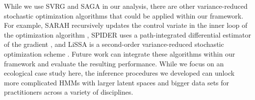 
%
%

While we use SVRG and SAGA in our analysis, there are other variance-reduced stochastic optimization algorithms that could be applied within our framework. For example, SARAH recursively updates the control variate in the inner loop of the optimization algorithm \citep{Nguyen:2017}, SPIDER uses a path-integrated differential estimator of the gradient \citep{Fang:2018}, and LiSSA is a second-order variance-reduced stochastic optimization scheme \citep{Agarwal:2017}. Future work can integrate these algorithms within our framework and evaluate the resulting performance. 
While we focus on an ecological case study here, the inference procedures we developed can unlock more complicated HMMs with larger latent spaces and bigger data sets for practitioners across a variety of disciplines.